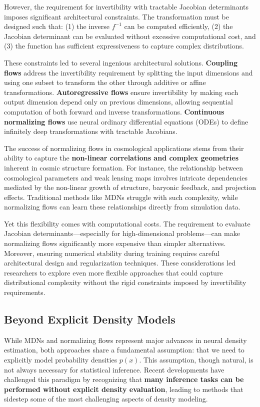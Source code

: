 \documentclass{SciPost}
\begin{document}
However, the requirement for invertibility with tractable Jacobian determinants imposes significant architectural constraints. The transformation must be designed such that: (1) the inverse $f^{-1}$ can be computed efficiently, (2) the Jacobian determinant can be evaluated without excessive computational cost, and (3) the function has sufficient expressiveness to capture complex distributions.

These constraints led to several ingenious architectural solutions. \textbf{Coupling flows} address the invertibility requirement by splitting the input dimensions and using one subset to transform the other through additive or affine transformations. \textbf{Autoregressive flows} ensure invertibility by making each output dimension depend only on previous dimensions, allowing sequential computation of both forward and inverse transformations. \textbf{Continuous normalizing flows} use neural ordinary differential equations (ODEs) to define infinitely deep transformations with tractable Jacobians.

The success of normalizing flows in cosmological applications stems from their ability to capture the \textbf{non-linear correlations and complex geometries} inherent in cosmic structure formation. For instance, the relationship between cosmological parameters and weak lensing maps involves intricate dependencies mediated by the non-linear growth of structure, baryonic feedback, and projection effects. Traditional methods like MDNs struggle with such complexity, while normalizing flows can learn these relationships directly from simulation data.

Yet this flexibility comes with computational costs. The requirement to evaluate Jacobian determinants—especially for high-dimensional problems—can make normalizing flows significantly more expensive than simpler alternatives. Moreover, ensuring numerical stability during training requires careful architectural design and regularization techniques. These considerations led researchers to explore even more flexible approaches that could capture distributional complexity without the rigid constraints imposed by invertibility requirements.

\subsection{Beyond Explicit Density Models}

While MDNs and normalizing flows represent major advances in neural density estimation, both approaches share a fundamental assumption: that we need to explicitly model probability densities $p(x)$. This assumption, though natural, is not always necessary for statistical inference. Recent developments have challenged this paradigm by recognizing that \textbf{many inference tasks can be performed without explicit density evaluation}, leading to methods that sidestep some of the most challenging aspects of density modeling.
\end{document}
